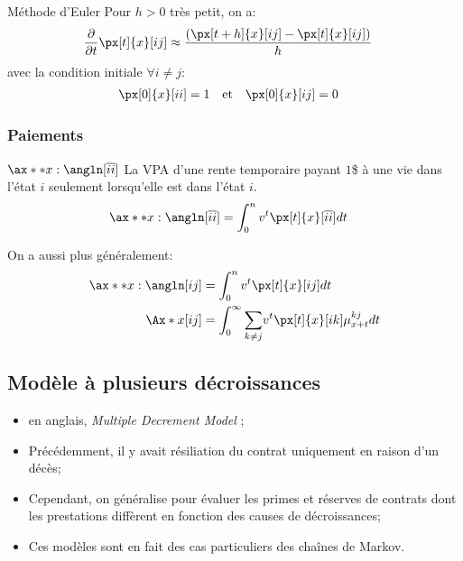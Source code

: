 \documentclass[10pt, french]{article}
\begin{document}
\begin{multicols*}{2}
\begin{conceptgen}{Méthode d'Euler}
Pour $h > 0$ très petit, on a: 
\begin{align*}
	\derivee{t}{} \px[t]{x}[ij]
	&\approx	\frac{(\px[t + h]{x}[ij] - \px[t]{x}[ij])}{h}
\end{align*}
avec la condition initiale $\forall i \neq j$:
\begin{align*}
	\px[0]{x}[ii]	&=	1	&	&\text{et}	&	\px[0]{x}[ij]	&=	0
\end{align*}
\end{conceptgen}

\subsubsection*{Paiements}
\begin{description}
	\item	$\ax**{x:\angln}[\overline{ii}]$	La VPA d'une rente temporaire payant $1$\$ à une vie dans l'état $i$ seulement lorsqu'elle est dans l'état $i$.
		\begin{align*}
		\ax**{x:\angln}[\overline{ii}]
		&=	\int_{0}^{n} v^{t} \px[t]{x}[\overline{ii}] dt
		\end{align*}
	\item	On a aussi plus généralement:
\begin{align*}
	\ax**{x:\angln}[ij]
	&=	\int_{0}^{n} v^{t} \px[t]{x}[ij] dt	\\
	\Ax*{x}[ij]
	&=	\int_{0}^{\infty} \sumz{}{k \neq j}	v^{t} \px[t]{x}[ik] \mu_{x + t}^{kj} dt
\end{align*}
\end{description}




\subsection*{Modèle à plusieurs décroissances}
\begin{itemize}[leftmargin = *]
	\item	en anglais, \og \textit{Multiple Decrement Model} \fg{};
	\item	Précédemment, il y avait résiliation du contrat uniquement en raison d'un décès;
	\item	Cependant, on généralise pour évaluer les primes et réserves de contrats dont les prestations diffèrent en fonction des causes de décroissances;
	\item	Ces modèles sont en fait des cas particuliers des chaînes de Markov.
\end{itemize}


\end{multicols*}
\end{document}
